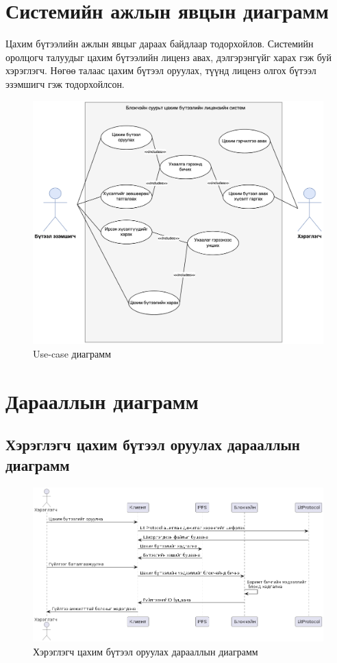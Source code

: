 \section{Системийн ажлын явцын диаграмм}
 Цахим бүтээлийн ажлын явцыг дараах байдлаар тодорхойлов. Системийн оролцогч талуудыг цахим бүтээлийн лиценз авах, дэлгэрэнгүйг харах гэж буй хэрэглэгч. Нөгөө талаас цахим бүтээл оруулах, түүнд лиценз олгох бүтээл эзэмшигч гэж тодорхойлсон.
\begin{figure}[h!]
	\centering
	\includegraphics[scale=0.36]{src/images/usecase.png}
	\caption{Use-case диаграмм}
\end{figure}

\pagebreak
\section{Дарааллын диаграмм}
\subsection{Хэрэглэгч цахим бүтээл оруулах дарааллын диаграмм}
\begin{figure}[h!]
	\centering
	\includegraphics[scale=0.55, angle=90]{src/images/sequence.png}
	\caption{Хэрэглэгч цахим бүтээл оруулах дарааллын диаграмм}
\end{figure}
